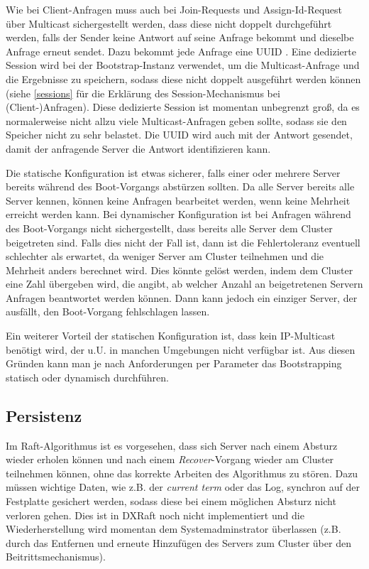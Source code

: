 Wie bei Client-Anfragen muss auch bei Join-Requests und Assign-Id-Request über Multicast sichergestellt werden, dass diese nicht doppelt durchgeführt werden, falls der Sender keine Antwort auf seine Anfrage bekommt und dieselbe Anfrage erneut sendet. Dazu bekommt jede Anfrage eine UUID \cite{uuid}. Eine dedizierte Session wird bei der Bootstrap-Instanz verwendet, um die Multicast-Anfrage und die Ergebnisse zu speichern, sodass diese nicht doppelt ausgeführt werden können (siehe \ref{sessions} für die Erklärung des Session-Mechanismus bei (Client-)Anfragen). Diese dedizierte Session ist momentan unbegrenzt groß, da es normalerweise nicht allzu viele Multicast-Anfragen geben sollte, sodass sie den Speicher nicht zu sehr belastet. Die UUID wird auch mit der Antwort gesendet, damit der anfragende Server die Antwort identifizieren kann.

Die statische Konfiguration ist etwas sicherer, falls einer oder mehrere  Server bereits während des Boot-Vorgangs abstürzen sollten. Da alle Server bereits alle Server kennen, können keine Anfragen bearbeitet werden, wenn keine Mehrheit erreicht werden kann. Bei dynamischer Konfiguration ist bei Anfragen während des Boot-Vorgangs nicht sichergestellt, dass bereits alle Server dem Cluster beigetreten sind. Falls dies nicht der Fall ist, dann ist die Fehlertoleranz eventuell schlechter als erwartet, da weniger Server am Cluster teilnehmen und die Mehrheit anders berechnet wird. Dies könnte gelöst werden, indem dem Cluster eine Zahl übergeben wird, die angibt, ab welcher Anzahl an beigetretenen Servern Anfragen beantwortet werden können. Dann kann jedoch ein einziger Server, der ausfällt, den Boot-Vorgang fehlschlagen lassen.

Ein weiterer Vorteil der statischen Konfiguration ist, dass kein IP-Multicast benötigt wird, der u.U. in manchen Umgebungen nicht verfügbar ist. Aus diesen Gründen kann man je nach Anforderungen per Parameter das Bootstrapping statisch oder dynamisch durchführen.

\subsection{Persistenz}

Im Raft-Algorithmus ist es vorgesehen, dass sich Server nach einem Absturz wieder erholen können und nach einem \textit{Recover}-Vorgang wieder am Cluster teilnehmen können, ohne das korrekte Arbeiten des Algorithmus zu stören. Dazu müssen wichtige Daten, wie z.B. der \textit{current term} oder das Log, synchron auf der Festplatte gesichert werden, sodass diese bei einem möglichen Absturz nicht verloren gehen. Dies ist in DXRaft noch nicht implementiert und die Wiederherstellung wird momentan dem Systemadminstrator überlassen (z.B. durch das Entfernen und erneute Hinzufügen des Servers zum Cluster über den Beitrittsmechanismus).

